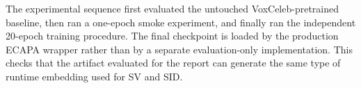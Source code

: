 The experimental sequence first evaluated the untouched VoxCeleb-pretrained baseline, then ran a one-epoch smoke experiment, and finally ran the independent 20-epoch training procedure. The final checkpoint is loaded by the production ECAPA wrapper rather than by a separate evaluation-only implementation. This checks that the artifact evaluated for the report can generate the same type of runtime embedding used for SV and SID.
